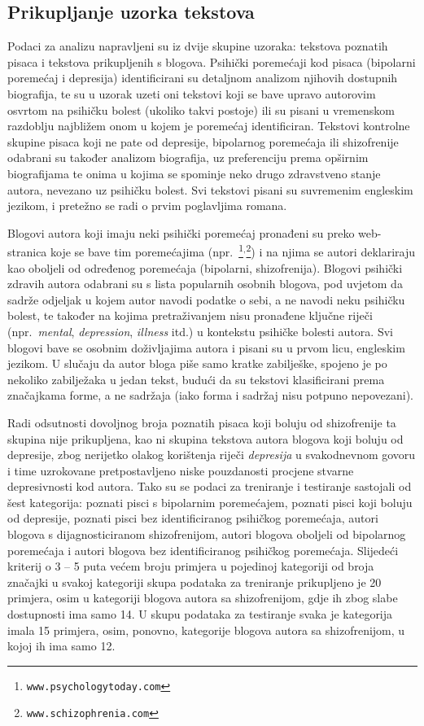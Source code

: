 \documentclass[10pt, a4paper]{article}
\begin{document}
\subsection{Prikupljanje uzorka tekstova}

Podaci za analizu napravljeni su iz dvije skupine uzoraka: tekstova poznatih pisaca i tekstova prikupljenih s blogova. Psihički poremećaji kod pisaca (bipolarni poremećaj i depresija) identificirani su detaljnom analizom njihovih dostupnih biografija, te su u uzorak uzeti oni tekstovi koji se bave upravo autorovim osvrtom na psihičku bolest (ukoliko takvi postoje) ili su pisani u vremenskom razdoblju najbližem onom u kojem je poremećaj identificiran. Tekstovi kontrolne skupine pisaca koji ne pate od depresije, bipolarnog poremećaja ili shizofrenije odabrani su također analizom biografija, uz preferenciju prema opširnim biografijama te onima u kojima se spominje neko drugo zdravstveno stanje autora, nevezano uz psihičku bolest. Svi tekstovi pisani su suvremenim engleskim jezikom, i pretežno se radi o prvim poglavljima romana.

Blogovi autora koji imaju neki psihički poremećaj pronađeni su preko web-stranica koje se bave tim poremećajima (npr.~\footnote{\texttt{www.psychologytoday.com}}$^,$\footnote{\texttt{www.schizophrenia.com}}) i na njima se autori deklariraju kao oboljeli od određenog poremećaja (bipolarni, shizofrenija). Blogovi psihički zdravih autora odabrani su s lista popularnih osobnih blogova, pod uvjetom da sadrže odjeljak u kojem autor navodi podatke o sebi, a ne navodi neku psihičku bolest, te također na kojima pretraživanjem nisu pronađene ključne riječi (npr.~\emph{mental}, \emph{depression}, \emph{illness} itd.) u kontekstu psihičke bolesti autora. Svi blogovi bave se osobnim doživljajima autora i pisani su u prvom licu, engleskim jezikom. U slučaju da autor bloga piše samo kratke zabilješke, spojeno je po nekoliko zabilježaka u jedan tekst, budući da su tekstovi klasificirani prema značajkama forme, a ne sadržaja (iako forma i sadržaj nisu potpuno nepovezani).

Radi odsutnosti dovoljnog broja poznatih pisaca koji boluju od shizofrenije ta skupina nije prikupljena, kao ni skupina tekstova autora blogova koji boluju od depresije, zbog nerijetko olakog korištenja riječi \emph{depresija} u svakodnevnom govoru i time uzrokovane pretpostavljeno niske pouzdanosti procjene stvarne depresivnosti kod autora. Tako su se podaci za treniranje i testiranje sastojali od šest kategorija: poznati pisci s bipolarnim poremećajem, poznati pisci koji boluju od depresije, poznati pisci bez identificiranog psihičkog poremećaja, autori blogova s dijagnosticiranom shizofrenijom, autori blogova oboljeli od bipolarnog poremećaja i autori blogova bez identificiranog psihičkog poremećaja. Slijedeći kriterij o 3 -- 5 puta većem broju primjera u pojedinoj kategoriji od broja značajki \citep{ribaric} u svakoj kategoriji skupa podataka za treniranje prikupljeno je 20 primjera, osim u kategoriji blogova autora sa shizofrenijom, gdje ih zbog slabe dostupnosti ima samo 14. U skupu podataka za testiranje svaka je kategorija imala 15 primjera, osim, ponovno, kategorije blogova autora sa shizofrenijom, u kojoj ih ima samo 12. 
\end{document}
